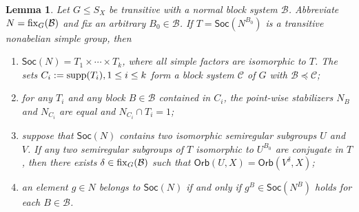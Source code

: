 \documentclass[11pt]{amsart}
\numberwithin{equation}{section}
\newtheorem{lem}[thrm]{Lemma}
\theoremstyle{definition}
\def\fix{{\rm fix}}
\def\soc{{\mathsf{Soc}}}
\def\supp{{\rm supp}}
\begin{document}
	\begin{lem}\label{support blocks}\label{simplegroupblock-cor}
		Let $G\leq S_X$ be transitive with a normal block system ${\mathcal  B}$. Abbreviate $N=\fix_G({\mathcal  B})$ and fix an arbitrary $B_0\in\mathcal{B}$.  If $T=\soc(N^{B_0})$ is a transitive nonabelian simple group, then
		\begin{enumerate}
			\item\label{parta} $\soc(N)= T_1\times \cdots \times T_k$, where all simple factors are isomorphic to $T$. The sets $C_i:=\supp(T_i), 1\le i\le k$ form a block system ${\mathcal C}$ of $G$ with ${\mathcal  B}\preceq {\mathcal  C}$;
			\item\label{parta1}
			for any $T_i$  and any block $B\in\mathcal{B}$ contained in $C_i$, the point-wise stabilizers $N_{B}$ and $N_{C_i}$ are equal and $N_{C_i}\cap T_i =1$;
			\item\label{partb} suppose that $\soc(N)$ contains two isomorphic semiregular subgroups $U$ and $V$.  If any two semiregular subgroups of $T$ isomorphic to $U^{B_0}$ are conjugate in $T$, then there exists $\delta\in \fix_G({\mathcal  B})$ such that $\mathsf{Orb}(U,X)=\mathsf{Orb}(V^\delta,X)$;
			\item\label{partc} an element $g\in N$ belongs to  $\soc(N)$ if and only if $g^{B}\in \soc(N^{B})$ holds for each $B\in\mathcal{B}$.
		\end{enumerate}
	\end{lem}
    
\end{document}
